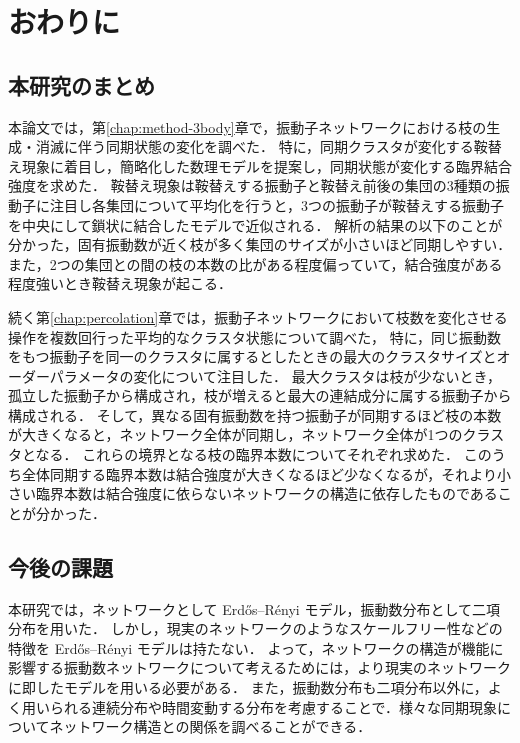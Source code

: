 \documentclass[../main]{subfiles}
\begin{document}
\chapter{おわりに}
\label{chap:summary}
\section{本研究のまとめ}
本論文では，第\ref{chap:method-3body}章で，振動子ネットワークにおける枝の生成・消滅に伴う同期状態の変化を調べた．
特に，同期クラスタが変化する鞍替え現象に着目し，簡略化した数理モデルを提案し，同期状態が変化する臨界結合強度を求めた．
鞍替え現象は鞍替えする振動子と鞍替え前後の集団の3種類の振動子に注目し各集団について平均化を行うと，3つの振動子が鞍替えする振動子を中央にして鎖状に結合したモデルで近似される．
解析の結果の以下のことが分かった，固有振動数が近く枝が多く集団のサイズが小さいほど同期しやすい．
また，2つの集団との間の枝の本数の比がある程度偏っていて，結合強度がある程度強いとき鞍替え現象が起こる．

続く第\ref{chap:percolation}章では，振動子ネットワークにおいて枝数を変化させる操作を複数回行った平均的なクラスタ状態について調べた，
特に，同じ振動数をもつ振動子を同一のクラスタに属するとしたときの最大のクラスタサイズとオーダーパラメータの変化について注目した．
最大クラスタは枝が少ないとき，孤立した振動子から構成され，枝が増えると最大の連結成分に属する振動子から構成される．
そして，異なる固有振動数を持つ振動子が同期するほど枝の本数が大きくなると，ネットワーク全体が同期し，ネットワーク全体が1つのクラスタとなる．
これらの境界となる枝の臨界本数についてそれぞれ求めた．
このうち全体同期する臨界本数は結合強度が大きくなるほど少なくなるが，それより小さい臨界本数は結合強度に依らないネットワークの構造に依存したものであることが分かった．
\section{今後の課題}
本研究では，ネットワークとして Erd\H{o}s–R\'{e}nyi モデル，振動数分布として二項分布を用いた．
しかし，現実のネットワークのようなスケールフリー性などの特徴を Erd\H{o}s–R\'{e}nyi モデルは持たない．
よって，ネットワークの構造が機能に影響する振動数ネットワークについて考えるためには，より現実のネットワークに即したモデル\cite{Moreno_2004}を用いる必要がある．
また，振動数分布も二項分布以外に，よく用いられる連続分布\cite{RevModPhys.77.137}や時間変動する分布\cite{CUMIN2007181}を考慮することで．様々な同期現象についてネットワーク構造との関係を調べることができる．
\end{document}
